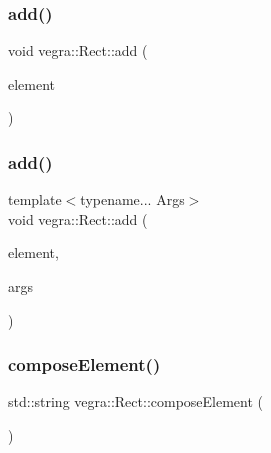 \mbox{\label{structvegra_1_1Rect_a3d6fd5f777b1faca1a850e9ba5328434}} 
\subsubsection{\texorpdfstring{add()}{add()}\hspace{0.1cm}{\footnotesize\ttfamily [2/3]}}
{\footnotesize\ttfamily void vegra\+::\+Rect\+::add (\begin{DoxyParamCaption}\item[{\mbox{\hyperlink{structvegra_1_1SVGElement}{vegra\+::\+S\+V\+G\+Element}} $\ast$}]{element }\end{DoxyParamCaption})\hspace{0.3cm}{\ttfamily [inline]}}

\mbox{\label{structvegra_1_1Rect_ae1d87cebca7a5eb3c9a2ce5e4782c2a6}} 
\subsubsection{\texorpdfstring{add()}{add()}\hspace{0.1cm}{\footnotesize\ttfamily [3/3]}}
{\footnotesize\ttfamily template$<$typename... Args$>$ \\
void vegra\+::\+Rect\+::add (\begin{DoxyParamCaption}\item[{\mbox{\hyperlink{structvegra_1_1SVGElement}{vegra\+::\+S\+V\+G\+Element}} $\ast$}]{element,  }\item[{Args...}]{args }\end{DoxyParamCaption})\hspace{0.3cm}{\ttfamily [inline]}}

\mbox{\label{structvegra_1_1Rect_a2f18ab8fb102c330de2e388a4f5cb324}} 
\subsubsection{\texorpdfstring{compose\+Element()}{composeElement()}}
{\footnotesize\ttfamily std\+::string vegra\+::\+Rect\+::compose\+Element (\begin{DoxyParamCaption}{ }\end{DoxyParamCaption})\hspace{0.3cm}{\ttfamily [inline]}}


